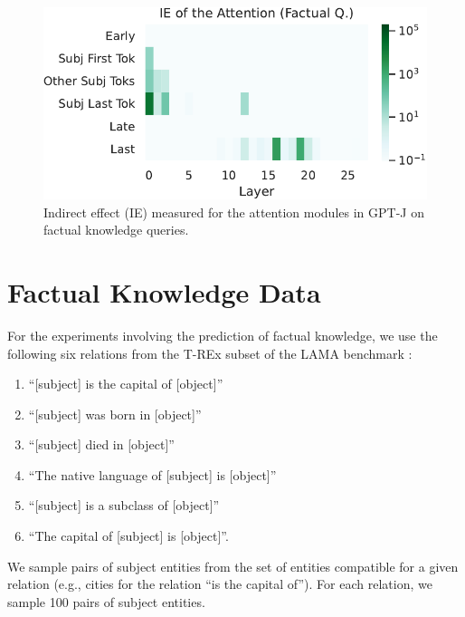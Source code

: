 \documentclass[11pt]{article}
\begin{document}
\begin{figure}[t]
    \centering
    \includegraphics[width=0.9\columnwidth]{img/j/j-lama-attn.pdf}
    \caption{Indirect effect (IE) measured for the attention modules in GPT-J on factual knowledge queries.}
    \label{fig:j-lama-attn}
\end{figure}


\section{Factual Knowledge Data}
\label{appendix:lama_details}
For the experiments involving the prediction of factual knowledge, we use the following six relations from the T-REx subset of the LAMA benchmark \cite{petroni-etal-2019-language}:
\begin{enumerate}
    \item ``[subject] is the capital of [object]''
    \item  ``[subject] was born in [object]''
    \item ``[subject] died in [object]''
    \item ``The native language of [subject] is [object]''
    \item ``[subject] is a subclass of [object]''
    \item ``The capital of [subject] is [object]''.
\end{enumerate}
We sample pairs of subject entities from the set of entities compatible for a given relation (e.g., cities for the relation ``is the capital of''). For each relation, we sample 100 pairs of subject entities. 
\end{document}
